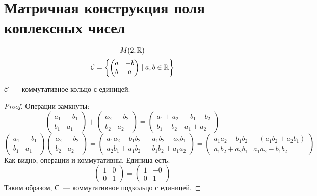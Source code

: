 \section{Матричная конструкция поля коплексных чисел}

$$M(2, \mathbb{R})$$
$$\mathcal{C} = \left\{\left(\begin{matrix}a & -b \\ b & a\end{matrix}\right) \mid a, b \in \mathbb{R}\right\}$$

\begin{assertion}
$\mathcal{C}$~--- коммутативное кольцо с единицей.
\end{assertion}
\begin{proof}
Операции замкнуты:
$$\left(\begin{matrix}a_1 & -b_1 \\ b_1 & a_1\end{matrix}\right) + \left(\begin{matrix}a_2 & -b_2 \\ b_2 & a_2\end{matrix}\right) = \left(\begin{matrix}a_1+a_2 & -b_1-b_2 \\ b_1+b_2 & a_1+a_2\end{matrix}\right)$$
$$\left(\begin{matrix}a_1 & -b_1 \\ b_1 & a_1\end{matrix}\right) \left(\begin{matrix}a_2 & -b_2 \\ b_2 & a_2\end{matrix}\right) = \left(\begin{matrix}a_1a_2-b_1b_2 & -a_1b_2-a_2b_1 \\ a_2b_1+a_1b_2 & -b_1b_2+a_1a_2\end{matrix}\right) = \left(\begin{matrix}a_1a_2-b_1b_2 & -(a_1b_2+a_2b_1) \\ a_1b_2+a_2b_1 & a_1a_2-b_1b_2\end{matrix}\right)$$
Как видно, операции и коммутативны.
Единица есть:
$$\left(\begin{matrix}1 & 0 \\ 0 & 1\end{matrix}\right) = \left(\begin{matrix}1 & -0 \\ 0 & 1\end{matrix}\right)$$
Таким образом, $\mathcal{С}$~--- коммутативное подкольцо с единицей.
\end{proof}

